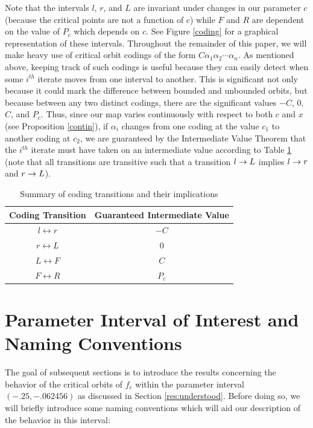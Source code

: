 	Note that the intervals $l$, $r$, and $L$ are invariant under changes in our parameter $c$ (because the critical points are not a function of $c$) while $F$ and $R$ are dependent on the value of $P_c$ which depends on $c$. See Figure \ref{coding} for a graphical representation of these intervals. Throughout the remainder of this paper, we will make heavy use of critical orbit codings of the form $C\alpha_1\alpha_2\cdots\alpha_n$. As mentioned above, keeping track of such codings is useful because they can easily detect when some $i^{th}$ iterate moves from one interval to another. This is significant not only because it could mark the difference between bounded and unbounded orbits, but because between any two distinct codings, there are the significant values $-C$, $0$, $C$, and $P_c$. Thus, since our map varies continuously with respect to both $c$ and $x$ (see Proposition \ref{contin}), if $\alpha_i$ changes from one coding at the value $c_1$ to another coding at $c_2$, we are guaranteed by the Intermediate Value Theorem that the $i^{th}$ iterate must have taken on an intermediate value according to Table \ref{trans} (note that all transitions are transitive such that a transition $l \rightarrow L$ implies $l \rightarrow r$ and $r \rightarrow L$).
	
	\begin{table}[h]
		\centering
		\begin{tabular}{|c|c|}
		\hline Coding Transition & Guaranteed Intermediate Value\\
		\hline $l \leftrightarrow r$ & $-C$\\
		\hline $r \leftrightarrow L$ & $0$\\
		\hline $L \leftrightarrow F$ & $C$\\
		\hline $F \leftrightarrow R$ & $P_c$\\
		\hline
		\end{tabular}
		\caption{Summary of coding transitions and their implications}
		\label{trans}
	\end{table}

	\section{Parameter Interval of Interest and Naming Conventions}

	The goal of subsequent sections is to introduce the results concerning the behavior of the critical orbits of $f_c$ within the parameter interval $ (-.25, -.062456)$ as discussed in Section \ref{res:understood}. Before doing so, we will briefly introduce some naming conventions which will aid our description of the behavior in this interval:

